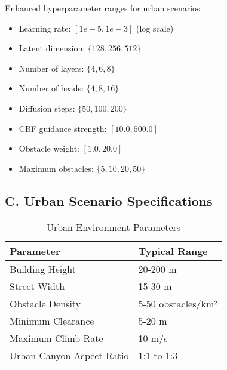 \documentclass[12pt]{article}
\begin{document}
Enhanced hyperparameter ranges for urban scenarios:

\begin{itemize}
    \item Learning rate: $[1e-5, 1e-3]$ (log scale)
    \item Latent dimension: $\{128, 256, 512\}$
    \item Number of layers: $\{4, 6, 8\}$
    \item Number of heads: $\{4, 8, 16\}$
    \item Diffusion steps: $\{50, 100, 200\}$
    \item CBF guidance strength: $[10.0, 500.0]$
    \item Obstacle weight: $[1.0, 20.0]$
    \item Maximum obstacles: $\{5, 10, 20, 50\}$
\end{itemize}

\subsection*{C. Urban Scenario Specifications}

\begin{table}[h]
\centering
\caption{Urban Environment Parameters}
\begin{tabular}{ll}
\toprule
\textbf{Parameter} & \textbf{Typical Range} \\
\midrule
Building Height & 20-200 m \\
Street Width & 15-30 m \\
Obstacle Density & 5-50 obstacles/km² \\
Minimum Clearance & 5-20 m \\
Maximum Climb Rate & 10 m/s \\
Urban Canyon Aspect Ratio & 1:1 to 1:3 \\
\bottomrule
\end{tabular}
\end{table}
\end{document}
